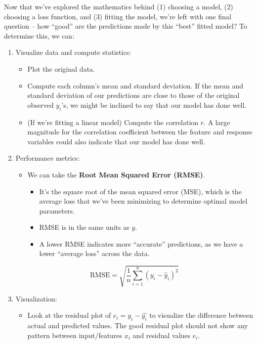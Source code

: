 \documentclass[
  letterpaper,
  DIV=11,
  numbers=noendperiod]{scrreprt}
\providecommand{\tightlist}{%
  \setlength{\itemsep}{0pt}\setlength{\parskip}{0pt}}\usepackage{longtable,booktabs,array}
\begin{document}
Now that we've explored the mathematics behind (1) choosing a model, (2)
choosing a loss function, and (3) fitting the model, we're left with one
final question -- how ``good'' are the predictions made by this ``best''
fitted model? To determine this, we can:

\begin{enumerate}
\def\labelenumi{\arabic{enumi}.}
\item
  Visualize data and compute statistics:

  \begin{itemize}
  \tightlist
  \item
    Plot the original data.
  \item
    Compute each column's mean and standard deviation. If the mean and
    standard deviation of our predictions are close to those of the
    original observed \(y_i\)'s, we might be inclined to say that our
    model has done well.
  \item
    (If we're fitting a linear model) Compute the correlation \(r\). A
    large magnitude for the correlation coefficient between the feature
    and response variables could also indicate that our model has done
    well.
  \end{itemize}
\item
  Performance metrics:

  \begin{itemize}
  \tightlist
  \item
    We can take the \textbf{Root Mean Squared Error (RMSE)}.

    \begin{itemize}
    \tightlist
    \item
      It's the square root of the mean squared error (MSE), which is the
      average loss that we've been minimizing to determine optimal model
      parameters.
    \item
      RMSE is in the same units as \(y\).
    \item
      A lower RMSE indicates more ``accurate'' predictions, as we have a
      lower ``average loss'' across the data.
    \end{itemize}
  \end{itemize}

  \[\text{RMSE} = \sqrt{\frac{1}{n} \sum_{i=1}^n (y_i - \hat{y}_i)^2}\]
\item
  Visualization:

  \begin{itemize}
  \tightlist
  \item
    Look at the residual plot of \(e_i = y_i - \hat{y_i}\) to visualize
    the difference between actual and predicted values. The good
    residual plot should not show any pattern between input/features
    \(x_i\) and residual values \(e_i\).
  \end{itemize}
\end{enumerate}
\end{document}
